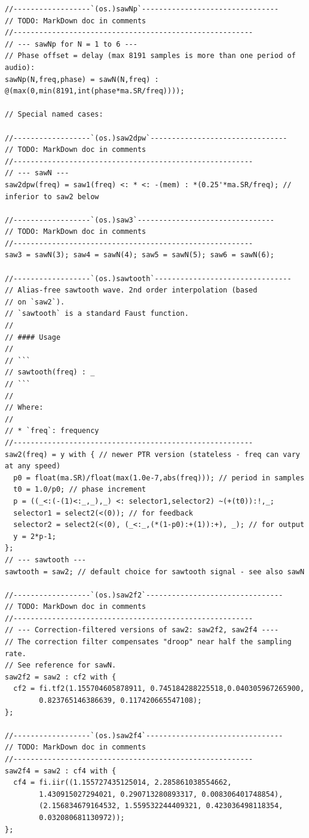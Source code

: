 \documentclass{article}
\begin{document}
\begin{lstlisting}[caption=\texttt{oscillators.lib}]
//------------------`(os.)sawNp`--------------------------------
// TODO: MarkDown doc in comments
//--------------------------------------------------------
// --- sawNp for N = 1 to 6 ---
// Phase offset = delay (max 8191 samples is more than one period of audio):
sawNp(N,freq,phase) = sawN(N,freq) : @(max(0,min(8191,int(phase*ma.SR/freq))));

// Special named cases:

//------------------`(os.)saw2dpw`--------------------------------
// TODO: MarkDown doc in comments
//--------------------------------------------------------
// --- sawN ---
saw2dpw(freq) = saw1(freq) <: * <: -(mem) : *(0.25'*ma.SR/freq); // inferior to saw2 below

//------------------`(os.)saw3`--------------------------------
// TODO: MarkDown doc in comments
//--------------------------------------------------------
saw3 = sawN(3); saw4 = sawN(4); saw5 = sawN(5); saw6 = sawN(6);

//------------------`(os.)sawtooth`--------------------------------
// Alias-free sawtooth wave. 2nd order interpolation (based
// on `saw2`).
// `sawtooth` is a standard Faust function.
//
// #### Usage
//
// ```
// sawtooth(freq) : _
// ```
//
// Where:
//
// * `freq`: frequency
//--------------------------------------------------------
saw2(freq) = y with { // newer PTR version (stateless - freq can vary at any speed)
  p0 = float(ma.SR)/float(max(1.0e-7,abs(freq))); // period in samples
  t0 = 1.0/p0; // phase increment
  p = ((_<:(-(1)<:_,_),_) <: selector1,selector2) ~(+(t0)):!,_;
  selector1 = select2(<(0)); // for feedback
  selector2 = select2(<(0), (_<:_,(*(1-p0):+(1)):+), _); // for output
  y = 2*p-1;
};
// --- sawtooth ---
sawtooth = saw2; // default choice for sawtooth signal - see also sawN

//------------------`(os.)saw2f2`--------------------------------
// TODO: MarkDown doc in comments
//--------------------------------------------------------
// --- Correction-filtered versions of saw2: saw2f2, saw2f4 ----
// The correction filter compensates "droop" near half the sampling rate.
// See reference for sawN.
saw2f2 = saw2 : cf2 with {
  cf2 = fi.tf2(1.155704605878911, 0.745184288225518,0.040305967265900,
        0.823765146386639, 0.117420665547108);
};

//------------------`(os.)saw2f4`--------------------------------
// TODO: MarkDown doc in comments
//--------------------------------------------------------
saw2f4 = saw2 : cf4 with {
  cf4 = fi.iir((1.155727435125014, 2.285861038554662,
        1.430915027294021, 0.290713280893317, 0.008306401748854),
        (2.156834679164532, 1.559532244409321, 0.423036498118354,
        0.032080681130972));
};


\end{lstlisting}
\end{document}
